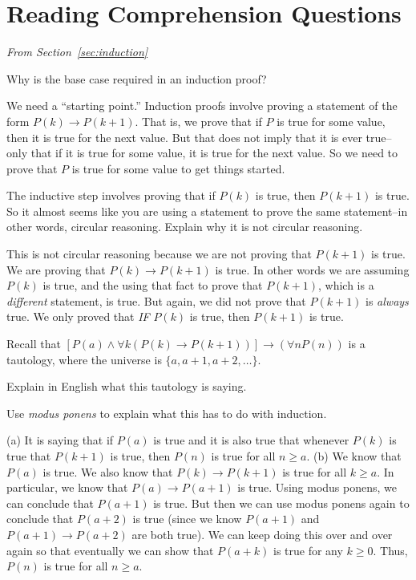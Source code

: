\section{Reading Comprehension Questions}

\noindent
{\em From Section~\ref{sec:induction}}

\begin{requ}
Why is the base case required in an induction proof?
\begin{requanswer}
We need a ``starting point.'' Induction proofs involve proving
a statement of the form $P(k)\rightarrow P(k+1)$. That is, we prove that if $P$ is 
true for some value, then it is true for the next value. 
But that does not imply that it is ever true--only that if it is true for some value,
it is true for the next value.
So we need to prove that $P$ is true for some value to get things started.
\end{requanswer}
\end{requ}

\begin{requ}
The inductive step involves proving that if $P(k)$ is true, then $P(k+1)$ is true.
So it almost seems like you are using a statement to prove the same statement--in other words, circular reasoning.
Explain why it is not circular reasoning.
\begin{requanswer}
This is not circular reasoning because we are not proving that $P(k+1)$ is true.
We are proving that $P(k)\rightarrow P(k+1)$ is true. 
In other words we are assuming $P(k)$ is true, and the using that fact to prove that $P(k+1)$, 
which is a {\em different} statement, is true. 
But again, we did not prove that $P(k+1)$
is {\em always} true. We only proved that {\em IF} $P(k)$ is true, then $P(k+1)$ is true.
\end{requanswer}
\end{requ}

\begin{requ}
Recall that
$[P(a)\wedge\forall k(P(k)\rightarrow P(k+1))]\rightarrow (\forall n P(n))$ is a tautology, where
the universe is $\{a,a+1,a+2,\ldots\}$.
\begin{lenum}
\item Explain in English what this tautology is saying.
\item Use {\em modus ponens} to explain what this has to do with induction. 
\end{lenum}
\begin{requanswer}
(a) It is saying that if $P(a)$ is true and it is also true that whenever $P(k)$ is true that $P(k+1)$ is true,
then $P(n)$ is true for all $n\geq a$.
(b) We know that $P(a)$ is true.
We also know that $P(k)\rightarrow P(k+1)$ is true for all $k\geq a$. 
In particular, we know that $P(a)\rightarrow P(a+1)$ is true. 
Using modus ponens, we can conclude that $P(a+1)$ is true. 
But then we can use modus ponens again to conclude that $P(a+2)$ is true
(since we know $P(a+1)$ and $P(a+1)\rightarrow P(a+2)$ are both true). 
We can keep doing this over and over again so that eventually we can
show that $P(a+k)$ is true for any $k\geq 0$. Thus, $P(n)$ is true for all $n\geq a$.
\end{requanswer}
\end{requ}

